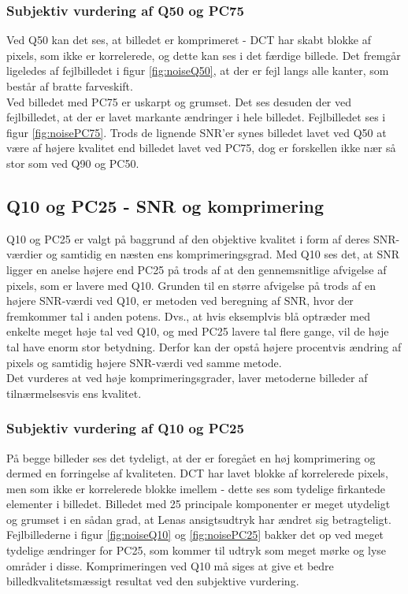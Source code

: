 \subsubsection{Subjektiv vurdering af Q50 og PC75}
Ved Q50 kan det ses, at billedet er komprimeret - DCT har skabt blokke af pixels, som ikke er korrelerede, og dette kan ses i det færdige billede. Det fremgår ligeledes af fejlbilledet i figur \ref{fig:noiseQ50}, at der er fejl langs alle kanter, som består af bratte farveskift.\\
Ved billedet med PC75 er uskarpt og grumset. Det ses desuden der ved fejlbilledet, at der er lavet markante ændringer i hele billedet. Fejlbilledet ses i figur \ref{fig:noisePC75}.
Trods de lignende SNR'er synes billedet lavet ved Q50 at være af højere kvalitet end billedet lavet ved PC75, dog er forskellen ikke nær så stor som ved Q90 og PC50.

\subsection*{Q10 og PC25 - SNR og komprimering}
Q10 og PC25 er valgt på baggrund af den objektive kvalitet i form af deres SNR-værdier og samtidig en næsten ens komprimeringsgrad. Med Q10 ses det, at SNR ligger en anelse højere end PC25 på trods af at den gennemsnitlige afvigelse af pixels, som er lavere med Q10. Grunden til en større afvigelse på trods af en højere SNR-værdi ved Q10, er metoden ved beregning af SNR, hvor der fremkommer tal i anden potens. Dvs., at hvis eksemplvis blå optræder med enkelte meget høje tal ved Q10, og med PC25 lavere tal flere gange, vil de høje tal have enorm stor betydning. Derfor kan der opstå højere procentvis ændring af pixels og samtidig højere SNR-værdi ved samme metode. \\
Det vurderes at ved høje komprimeringsgrader, laver metoderne billeder af tilnærmelsesvis ens kvalitet.

\subsubsection{Subjektiv vurdering af Q10 og PC25}
På begge billeder ses det tydeligt, at der er foregået en høj komprimering og dermed en forringelse af kvaliteten. DCT har lavet blokke af korrelerede pixels, men som ikke er korrelerede blokke imellem - dette ses som tydelige firkantede elementer i billedet. Billedet med 25 principale komponenter er meget utydeligt og grumset i en sådan grad, at Lenas ansigtsudtryk har ændret sig betragteligt. Fejlbillederne i figur \ref{fig:noiseQ10} og \ref{fig:noisePC25} bakker det op ved meget tydelige ændringer for PC25, som kommer til udtryk som meget mørke og lyse områder i disse. Komprimeringen ved Q10 må siges at give et bedre billedkvalitetsmæssigt resultat ved den subjektive vurdering.

